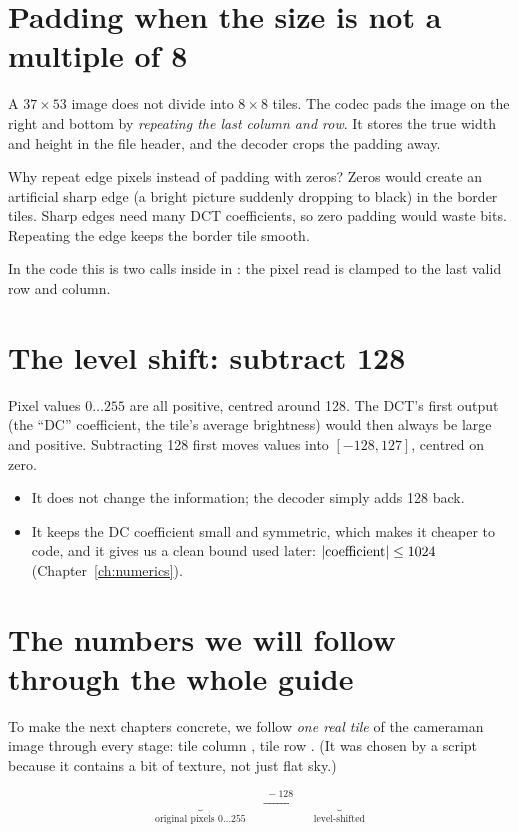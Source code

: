 \section{Padding when the size is not a multiple of 8}

A $37\times53$ image does not divide into $8\times8$ tiles. The codec pads the image on the right and bottom by \emph{repeating the last column and row}. It stores the true width and height in the file header, and the decoder crops the padding away.

\begin{plain}
Why repeat edge pixels instead of padding with zeros? Zeros would create an artificial sharp edge (a bright picture suddenly dropping to black) in the border tiles. Sharp edges need many DCT coefficients, so zero padding would waste bits. Repeating the edge keeps the border tile smooth.
\end{plain}

In the code this is two  calls inside  in : the pixel read is clamped to the last valid row and column.

\section{The level shift: subtract 128}

Pixel values $0\ldots255$ are all positive, centred around 128. The DCT's first output (the ``DC'' coefficient, the tile's average brightness) would then always be large and positive. Subtracting 128 first moves values into $[-128,127]$, centred on zero.

\begin{itemize}
\item It does not change the information; the decoder simply adds 128 back.
\item It keeps the DC coefficient small and symmetric, which makes it cheaper to code, and it gives us a clean bound used later: $|{\rm coefficient}|\le 1024$ (Chapter~\ref{ch:numerics}).
\end{itemize}

\section{The numbers we will follow through the whole guide}

To make the next chapters concrete, we follow \emph{one real tile} of the cameraman image through every stage: tile column \exBlockX, tile row \exBlockY. (It was chosen by a script because it contains a bit of texture, not just flat sky.)

\[
\underbrace{}_{\text{original pixels } 0\ldots255}
\quad\xrightarrow{\;-128\;}\quad
\underbrace{}_{\text{level-shifted}}
\]
